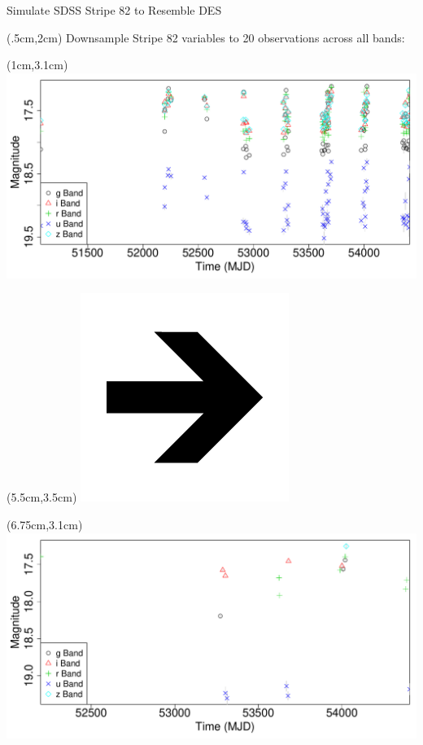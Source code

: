 \documentclass[12pt]{beamer}
\begin{document}
\begin{frame}{Simulate SDSS Stripe 82 to Resemble DES}

  \begin{textblock*}{12cm}(.5cm,2cm) %
Downsample Stripe 82 variables to 20 observations across all bands:
\end{textblock*}

  \begin{textblock*}{3cm}(1cm,3.1cm) %
\includegraphics[scale=.15]{figs/unfolded_13350.pdf}
\end{textblock*}


  \begin{textblock*}{3cm}(5.5cm,3.5cm) %
\includegraphics[scale=.15]{figs/rightarrow.png}
\end{textblock*}

  \begin{textblock*}{3cm}(6.75cm,3.1cm) %
\includegraphics[scale=.15]{figs/unfolded_13350down.pdf}
\end{textblock*}


\end{frame}
\end{document}
